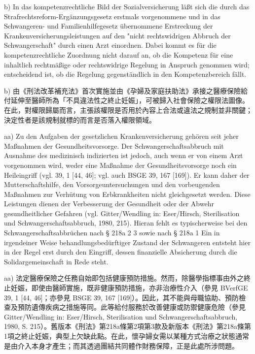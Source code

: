 \documentclass[12pt]{article}
\begin{document}
\begin{sourcepara}[title={原文E.198}]
b) In das kompetenzrechtliche Bild der Sozialversicherung läßt sich die durch das Strafrechtsreform-Ergänzungsgesetz erstmals vorgenommene und in das Schwangeren- und Familienhilfegesetz übernommene Erstreckung der Krankenversicherungsleistungen auf den "nicht rechtswidrigen Abbruch der Schwangerschaft" durch einen Arzt einordnen. Dabei kommt es für die kompetenzrechtliche Zuordnung nicht darauf an, ob die Kompetenz für eine inhaltlich rechtmäßige oder rechtswidrige Regelung in Anspruch genommen wird; entscheidend ist, ob die Regelung gegenständlich in den Kompetenzbereich fällt.
\end{sourcepara}
\begin{transpara}
b) 由《刑法改革補充法》首次實施並由《孕婦及家庭扶助法》承接之醫療保險給付延伸至醫師所為「不具違法性之終止妊娠」，可被歸入社會保險之權限法圖像。在此，對權限歸屬而言，主張該權限是否用於內容上合法或違法之規制並非關鍵；決定性者是該規制就標的而言是否落入權限領域。
\end{transpara}

\begin{sourcepara}[title={原文E.199}]
aa) Zu den Aufgaben der gesetzlichen Krankenversicherung gehören seit jeher Maßnahmen der Gesundheitsvorsorge. Der Schwangerschaftsabbruch mit Ausnahme des medizinisch indizierten ist jedoch, auch wenn er von einem Arzt vorgenommen wird, weder eine Maßnahme der Gesundheitsvorsorge noch ein Heileingriff (vgl. \abbrBVerfGE{} 39, 1 [44, 46]; vgl. auch BSGE 39, 167 [169]). Er kann daher der Mutterschaftshilfe, den Vorsorgeuntersuchungen und den vorbeugenden Maßnahmen zur Verhütung von Erbkrankheiten nicht gleichgesetzt werden. Diese Leistungen dienen der Verbesserung der Gesundheit oder der Abwehr gesundheitlicher Gefahren (vgl. Gitter/Wendling in: Eser/Hirsch, Sterilisation und Schwangerschaftsabbruch, 1980, \abbrS{} 215). Hieran fehlt es typischerweise bei den Schwangerschaftsabbrüchen nach § 218a \abbrAbs{} 2 \abbrNr{} 3 \abbrStGB{} \abbrAF{} sowie nach § 218a \abbrAbs{} 1 \abbrStGB{} \abbrNF{} Ein in irgendeiner Weise behandlungsbedürftiger Zustand der Schwangeren entsteht hier in der Regel erst durch den Eingriff, dessen finanzielle Absicherung durch die Solidargemeinschaft in Rede steht.
\end{sourcepara}
\begin{transpara}
aa) 法定醫療保險之任務自始即包括健康預防措施。然而，除醫學指標事由外之終止妊娠，即使由醫師實施，既非健康預防措施，亦非治療性介入（參見 BVerfGE 39, 1 [44, 46]；亦參見 BSGE 39, 167 [169]）。因此，其不能與母職協助、預防檢查及預防遺傳疾病之措施等同。此等給付服務於改善健康或防禦健康危險（參見 Gitter/Wendling in: Eser/Hirsch, Sterilisation und Schwangerschaftsabbruch, 1980, S. 215）。舊版本《刑法》第218a條第2項第3款及新版本《刑法》第218a條第1項之終止妊娠，典型上欠缺此點。在此，懷孕婦女需以某種方式治療之狀態通常是由介入本身才產生；而其透過團結共同體作財務保障，正是此處所涉問題。
\end{transpara}
\end{document}
